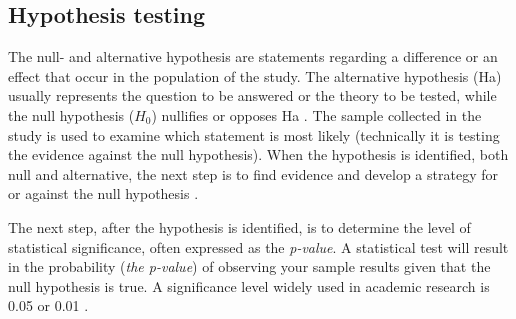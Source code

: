 


\subsection{Hypothesis testing}\label{sec:hypothesistesting}
The null- and alternative hypothesis are statements regarding a difference or an effect that occur in the population of the study. The alternative hypothesis (Ha) usually represents the question to be answered or the theory to be tested, while the null hypothesis ($H_{0}$) nullifies or opposes Ha \citep{Walpole2012}. The sample collected in the study is used to examine which statement is most likely (technically it is testing the evidence against the null hypothesis).  When the hypothesis is identified, both null and alternative, the next step is to find evidence and develop a strategy for or against the null hypothesis \citep{LundResearchLtd2013}.

The next step, after the hypothesis is identified, is to determine the level of statistical significance, often expressed as the \textit{p-value}. A statistical test will result in the probability (\textit{the p-value}) of observing your sample results given that the null hypothesis is true. A significance level widely used in academic research is 0.05 or 0.01 \citep{Walpole2012}. 

